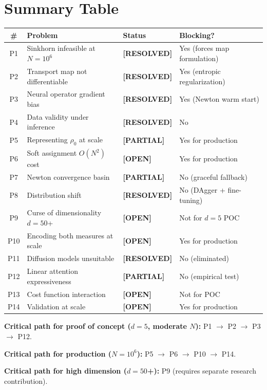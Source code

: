 \documentclass[11pt]{article}
\newcommand{\statusopen}{\textcolor{open}{\textbf{[OPEN]}}}
\newcommand{\statuspartial}{\textcolor{partial}{\textbf{[PARTIAL]}}}
\newcommand{\statusresolved}{\textcolor{resolved}{\textbf{[RESOLVED]}}}
\begin{document}
\section*{Summary Table}

\begin{center}
\small
\begin{tabular}{@{}clll@{}}
\toprule
\textbf{\#} & \textbf{Problem} & \textbf{Status} & \textbf{Blocking?} \\
\midrule
P1 & Sinkhorn infeasible at $N = 10^6$ & \statusresolved & Yes (forces map formulation) \\
P2 & Transport map not differentiable & \statusresolved & Yes (entropic regularization) \\
P3 & Neural operator gradient bias & \statusresolved & Yes (Newton warm start) \\
P4 & Data validity under inference & \statusresolved & No \\
P5 & Representing $\rho_0$ at scale & \statuspartial & Yes for production \\
P6 & Soft assignment $O(N^2)$ cost & \statusopen & Yes for production \\
P7 & Newton convergence basin & \statuspartial & No (graceful fallback) \\
P8 & Distribution shift & \statusresolved & No (DAgger + fine-tuning) \\
P9 & Curse of dimensionality $d = 50$+ & \statusopen & Not for $d = 5$ POC \\
P10 & Encoding both measures at scale & \statusopen & Yes for production \\
P11 & Diffusion models unsuitable & \statusresolved & No (eliminated) \\
P12 & Linear attention expressiveness & \statuspartial & No (empirical test) \\
P13 & Cost function interaction & \statusopen & Not for POC \\
P14 & Validation at scale & \statusopen & Yes for production \\
\bottomrule
\end{tabular}
\end{center}

\vspace{0.5em}

\textbf{Critical path for proof of concept ($d = 5$, moderate $N$):} P1 $\to$ P2 $\to$ P3 $\to$ P12.

\textbf{Critical path for production ($N = 10^6$):} P5 $\to$ P6 $\to$ P10 $\to$ P14.

\textbf{Critical path for high dimension ($d = 50$+):} P9 (requires separate research contribution).
\end{document}
